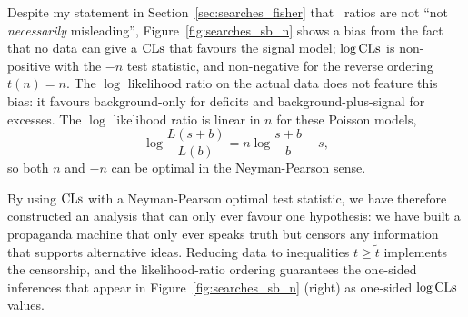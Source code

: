 Despite my statement in Section~\ref{sec:searches_fisher} that \pvalue\
ratios are not ``not \emph{necessarily} misleading'',
Figure~\ref{fig:searches_sb_n} shows a bias from the fact that
no data can give a $\mathrm{CLs}$ that favours the signal model;
$\log\mathrm{CLs}$ is non-positive with the $-n$ test statistic, and non-negative
for the reverse ordering $t(n) = n$.
The $\log$ likelihood ratio on the actual data does not feature this bias:
it favours background-only for deficits and background-plus-signal for
excesses.
The $\log$ likelihood ratio is linear in $n$ for these Poisson models,
\begin{equation}
\log \frac{L(s + b)}{L(b)}
= n\log\frac{s + b}{b} - s
,
\end{equation}
so both $n$ and $-n$ can be optimal in the Neyman-Pearson sense.

By using $\mathrm{CLs}$ with a Neyman-Pearson optimal test statistic, we have therefore
constructed an analysis that can only ever favour one hypothesis:
we have built a propaganda machine that only ever speaks truth but censors any
information that supports alternative ideas.
Reducing data to inequalities $t \geq \tilde{t}$ implements the censorship,
and the likelihood-ratio ordering guarantees the one-sided inferences
that appear in Figure~\ref{fig:searches_sb_n} (right) as one-sided
$\log\mathrm{CLs}$ values.

